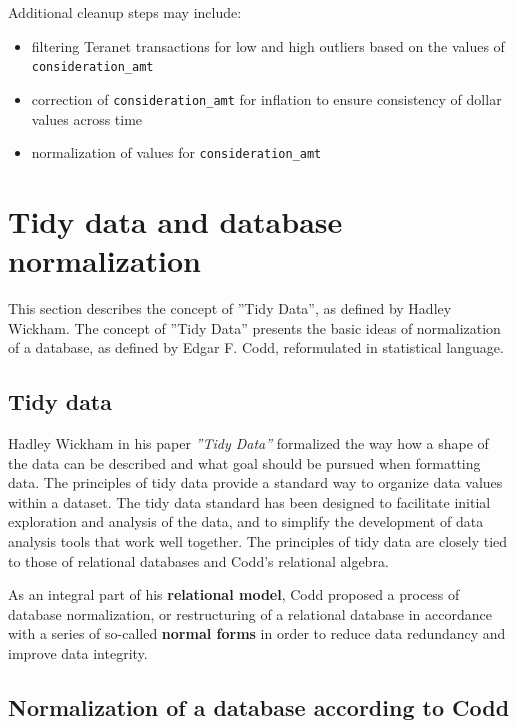 \documentclass[11pt]{article}
\begin{document}
    \vspace{5mm}

    Additional cleanup steps may include:
    \begin{itemize}
        \item filtering Teranet transactions for low and high outliers based on the values of \texttt{consideration\_amt}
        \item correction of \texttt{consideration\_amt} for inflation to ensure consistency of dollar values across time
        \item normalization of values for \texttt{consideration\_amt}
    \end{itemize}

    \section{Tidy data and database normalization} \label{sec:db_norm_tidy_data}

    This section describes the concept of ''Tidy Data'', as defined by Hadley Wickham.
    The concept of ''Tidy Data'' presents the basic ideas of normalization of a database, as defined by Edgar F. Codd, reformulated in statistical language.

    \subsection{Tidy data} \label{subsec:tidy_data}

    Hadley Wickham in his paper \textit{''Tidy Data''}\cite{Wickham2014} formalized the way how a shape of the data can be described and what goal should be pursued when formatting data.
    The principles of tidy data provide a standard way to organize data values within a dataset.
    The tidy data standard has been designed to facilitate initial exploration and analysis of the data, and to simplify the development of data analysis tools that work well together.
    The principles of tidy data are closely tied to those of relational databases and Codd's relational algebra\cite{Codd1990}.

    As an integral part of his \textbf{relational model}, Codd proposed a process of database normalization, or restructuring of a relational database in accordance with a series of so-called \textbf{normal forms} in order to reduce data redundancy and improve data integrity.

    \subsection{Normalization of a database according to Codd} \label{subsec:db_norm}
\end{document}
